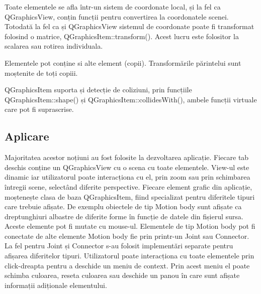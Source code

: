 \begin{itemize}
    Toate elementele se afla într-un sistem de coordonate local, și la fel ca QGraphicsView, conțin funcții pentru 
    convertirea la coordonatele scenei. Totodată la fel ca și QGraphicsView sistemul de coordonate poate fi transformat 
    folosind o matrice,  QGraphicsItem::transform(). Acest lucru este folositor la scalarea sau rotirea individuala.\newline

    Elementele pot conține si alte element (copii). Transformările părintelui sunt moștenite de toți copiii.\newline
    
    QGraphicsItem suporta și detecție de coliziuni, prin funcțiile QGraphicsItem::shape() și QGraphicsItem::collidesWith(), 
    ambele funcții virtuale care pot fi suprascrise.\newline
\end{itemize}

\subsection{Aplicare}

Majoritatea acestor noțiuni au fost folosite la dezvoltarea aplicație. 
Fiecare tab deschis conține un QGraphicsView cu o scena cu toate elementele. 
View-ul este dinamic iar utilizatorul poate interacționa cu el, prin zoom sau prin schimbarea întregii scene, 
selectând diferite perspective. Fiecare element grafic din aplicație, moștenește clasa de baza QGraphicsItem, 
fiind specializat pentru diferitele tipuri care trebuie afișate. De exemplu obiectele de tip Motion body sunt 
afișate ca dreptunghiuri albastre de diferite forme în funcție de datele din fișierul sursa. Aceste elemente 
pot fi mutate cu mouse-ul. Elementele de tip Motion body pot fi conectate de alte elemente Motion body fie prin 
printr-un Joint sau Connector. La fel pentru Joint și Connector s-au folosit implementări separate pentru afișarea 
diferitelor tipuri. Utilizatorul poate interacționa cu toate elementele prin click-dreapta pentru a deschide un meniu de context. 
Prin acest meniu el poate schimba culoarea, reseta culoarea sau deschide un panou în care sunt afișate informații adiționale 
elementului.\newline






